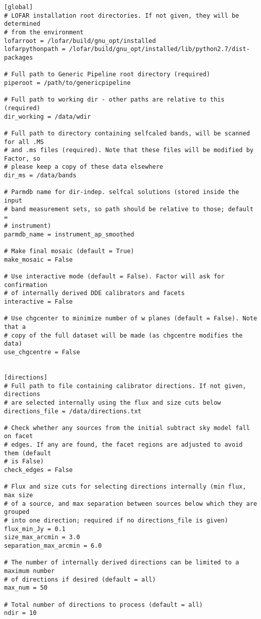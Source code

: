 \documentclass[structabstract]{article}
\begin{document}
\begin{verbatim}
[global]
# LOFAR installation root directories. If not given, they will be determined
# from the environment
lofarroot = /lofar/build/gnu_opt/installed
lofarpythonpath = /lofar/build/gnu_opt/installed/lib/python2.7/dist-packages

# Full path to Generic Pipeline root directory (required)
piperoot = /path/to/genericpipeline

# Full path to working dir - other paths are relative to this (required)
dir_working = /data/wdir

# Full path to directory containing selfcaled bands, will be scanned for all .MS
# and .ms files (required). Note that these files will be modified by Factor, so
# please keep a copy of these data elsewhere
dir_ms = /data/bands

# Parmdb name for dir-indep. selfcal solutions (stored inside the input
# band measurement sets, so path should be relative to those; default =
# instrument)
parmdb_name = instrument_ap_smoothed

# Make final mosaic (default = True)
make_mosaic = False

# Use interactive mode (default = False). Factor will ask for confirmation
# of internally derived DDE calibrators and facets
interactive = False

# Use chgcenter to minimize number of w planes (default = False). Note that a
# copy of the full dataset will be made (as chgcentre modifies the data)
use_chgcentre = False


[directions]
# Full path to file containing calibrator directions. If not given, directions
# are selected internally using the flux and size cuts below
directions_file = /data/directions.txt

# Check whether any sources from the initial subtract sky model fall on facet
# edges. If any are found, the facet regions are adjusted to avoid them (default
# is False)
check_edges = False

# Flux and size cuts for selecting directions internally (min flux, max size
# of a source, and max separation between sources below which they are grouped
# into one direction; required if no directions_file is given)
flux_min_Jy = 0.1
size_max_arcmin = 3.0
separation_max_arcmin = 6.0

# The number of internally derived directions can be limited to a maximum number
# of directions if desired (default = all)
max_num = 50

# Total number of directions to process (default = all)
ndir = 10


\end{verbatim}
\end{document}
